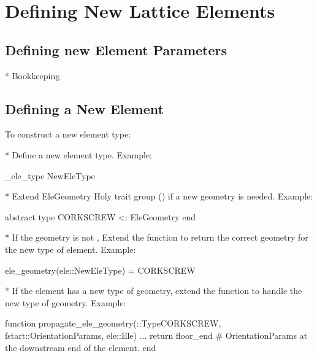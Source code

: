 \chapter{Defining New Lattice Elements}
\label{c:new.ele}

\section{Defining new Element Parameters}

* Bookkeeping 

\section{Defining a New Element}
\label{s:new.ele}

To construct a new element type:

* Define a new element type. Example:
\begin{example}
  \@construct_ele_type NewEleType
\end{example}

* Extend EleGeometry Holy trait group () if a new geometry is needed. Example:
\begin{example}
  abstract type CORKSCREW <: EleGeometry end
\end{example}

* If the geometry is not , Extend the  function to return the 
correct geometry for the new type of element. Example:
\begin{example}
  ele_geometry(ele::NewEleType) = CORKSCREW
\end{example}

* If the element has a new type of geometry, extend the  function
to handle the new type of geometry. Example:
\begin{example}
  function propagate_ele_geometry(::Type{CORKSCREW}, fstart::OrientationParams, ele::Ele)
    ...
    return floor_end  # OrientationParams at the downstream end of the element.
  end
\end{example}



